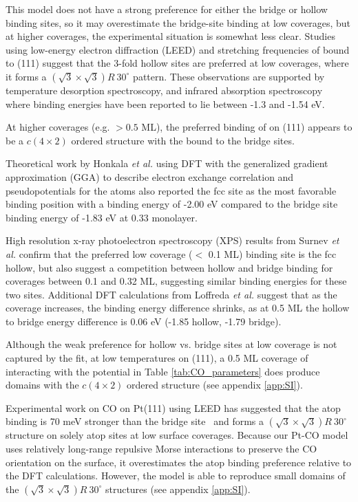 This  model does not have a strong preference for
either the bridge or hollow binding sites, so it may overestimate the
bridge-site binding at low coverages, but at higher coverages, the
experimental situation is somewhat less clear.\citep{Wong:1991ta}
Studies using low-energy electron diffraction (LEED) and
 stretching frequencies of  bound to
(111) suggest that the 3-fold hollow sites are preferred at low
coverages,\citep{Bradshaw:1978uf, Conrad:1978fx, Ohtani:1987zh} where it
forms a $(\sqrt{3} \times \sqrt{3}) R~30^{\circ}$ pattern.  These
observations are supported by temperature desorption
spectroscopy,\citep{Guo:1989aa} and infrared absorption
spectroscopy~\citep{Szanyi:1992aa} where binding energies have been
reported to lie between -1.3 and -1.54 eV.

At higher  coverages (e.g. $> 0.5$ ML), the preferred binding
of  on (111) appears to be a $c(4\times2)$ ordered
structure with the  bound to the bridge
sites.\citep{Bradshaw:1978uf} 

Theoretical work by Honkala \textit{et al.}\citep{Honkala:2001sf} using
DFT with the generalized gradient approximation (GGA) to describe
electron exchange correlation and pseudopotentials for the 
atoms also reported the fcc site as the most favorable binding
position with a binding energy of -2.00 eV compared to the bridge site
binding energy of -1.83 eV at 0.33 monolayer.

High resolution x-ray photoelectron spectroscopy (XPS) results from
Surnev \textit{et al.}\citep{Surnev:2000uk} confirm that the preferred
low coverage ($< $ 0.1 ML) binding site is the fcc hollow, but also
suggest a competition between hollow and bridge binding for coverages
between 0.1 and 0.32 ML, suggesting similar binding energies for these
two sites. Additional DFT calculations from Loffreda \textit{et
al.}\citep{Loffreda:1999vl} suggest that as the coverage increases, the
binding energy difference shrinks, as at 0.5 ML the hollow to bridge
energy difference is 0.06 eV (-1.85 hollow, -1.79 bridge).

Although the weak preference for hollow vs. bridge sites at low
coverage is not captured by the  fit, at low
temperatures on (111), a 0.5 ML coverage of  interacting
with the potential in Table \ref{tab:CO_parameters} does produce
domains with the $c(4\times2)$ ordered structure (see 
appendix \ref{app:SI}).

Experimental work on CO on Pt(111) using LEED has suggested that the
atop binding is 70 meV stronger than the bridge
site~\citep{Schweizer:1989fk} and forms a
$(\sqrt{3} \times \sqrt{3}) R~30^{\circ}$ structure on solely atop
sites at low surface coverages.\citep{Kelemen:1979ad} Because our Pt-CO
model uses relatively long-range repulsive Morse interactions to
preserve the CO orientation on the surface, it overestimates the atop
binding preference relative to the DFT calculations.  However, the
model is able to reproduce small domains of the
$(\sqrt{3} \times \sqrt{3}) R~30^{\circ}$ structures (see 
appendix \ref{app:SI}).

